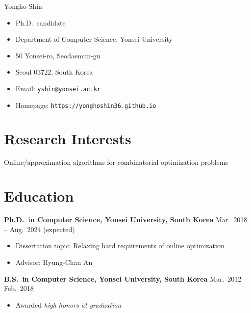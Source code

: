 \documentclass{article}
\newcommand{\killinitspace}{-0.7em}
\begin{document}
{\Huge Yongho Shin}
\begin{itemize}[itemsep=-3pt, leftmargin=2.5pt, label=]
\item Ph.D.~candidate
\item Department of Computer Science, Yonsei University
\item 50 Yonsei-ro, Seodaemun-gu
\item Seoul 03722, South Korea
\item Email: \texttt{yshin@yonsei.ac.kr}
\item Homepage: \texttt{https://yonghoshin36.github.io}
\end{itemize}

\section{Research Interests}
Online/approximation algorithms for combinatorial optimization problems

\section{Education}
\textbf{Ph.D.~in Computer Science, Yonsei University, South Korea} \hfill Mar.~2018 -- Aug.~2024 (expected)
\vspace{\killinitspace}
\begin{itemize}
\item Dissertation topic: Relaxing hard requirements of online optimization
\item Advisor: Hyung-Chan An
\end{itemize}

\textbf{B.S.~in Computer Science, Yonsei University, South Korea} \hfill Mar.~2012 -- Feb.~2018
\vspace{\killinitspace}
\begin{itemize}
\item Awarded \textsl{high honors at graduation}
\end{itemize}
\end{document}

